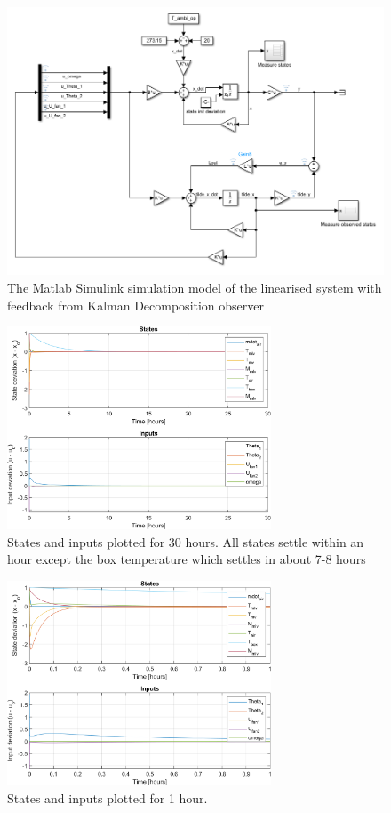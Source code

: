 \begin{figure}[h!]
	\centering
	\includegraphics[width=1\textwidth]{Graphics/fig_modelSS_obs.png}
	\caption{The Matlab Simulink simulation model of the linearised system with feedback from Kalman Decomposition observer}
	\label{fig:sim_modelSS_obs}
\end{figure}

\begin{figure}[h!]
	\centering
	\includegraphics[width=0.7\textwidth]{Graphics/fig_stateInput30h.png}
	\caption{States and inputs plotted for 30 hours. All states settle within an hour except the box temperature which settles in about 7-8 hours}
	\label{fig:sim_stateInput30h}
\end{figure}

\begin{figure}[h!]
	\centering
	\includegraphics[width=0.7\textwidth]{Graphics/fig_stateInput1h.png}
	\caption{States and inputs plotted for 1 hour.}
	\label{fig:sim_stateInput1h}
\end{figure}

